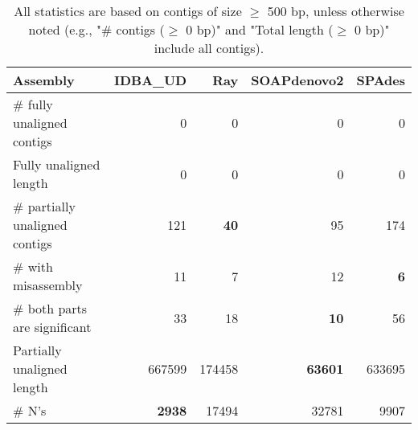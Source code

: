 \documentclass[12pt,a4paper]{article}
\begin{document}
\begin{table}[ht]
\begin{center}
\caption{All statistics are based on contigs of size $\geq$ 500 bp, unless otherwise noted (e.g., "\# contigs ($\geq$ 0 bp)" and "Total length ($\geq$ 0 bp)" include all contigs).}
\begin{tabular}{|l*{4}{|r}|}
\hline
Assembly & IDBA\_UD & Ray & SOAPdenovo2 & SPAdes \\ \hline
\# fully unaligned contigs & 0 & 0 & 0 & 0 \\ \hline
Fully unaligned length & 0 & 0 & 0 & 0 \\ \hline
\# partially unaligned contigs & 121 & {\bf 40} & 95 & 174 \\ \hline
\hspace{5mm}\# with misassembly & 11 & 7 & 12 & {\bf 6} \\ \hline
\hspace{5mm}\# both parts are significant & 33 & 18 & {\bf 10} & 56 \\ \hline
Partially unaligned length & 667599 & 174458 & {\bf 63601} & 633695 \\ \hline
\# N's & {\bf 2938} & 17494 & 32781 & 9907 \\ \hline
\end{tabular}
\end{center}
\end{table}
\end{document}
